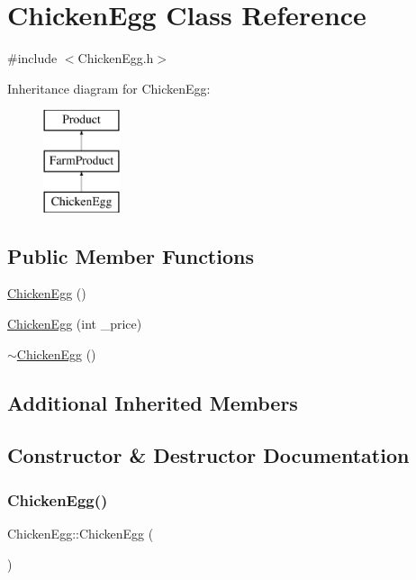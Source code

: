 \hypertarget{classChickenEgg}{}\section{Chicken\+Egg Class Reference}
\label{classChickenEgg}


{\ttfamily \#include $<$Chicken\+Egg.\+h$>$}

Inheritance diagram for Chicken\+Egg\+:\begin{figure}[H]
\begin{center}
\leavevmode
\includegraphics[height=3.000000cm]{classChickenEgg}
\end{center}
\end{figure}
\subsection*{Public Member Functions}
\begin{DoxyCompactItemize}
\item 
\mbox{\hyperlink{classChickenEgg_aebcaf30d3a47ddb3a7874ed4e4c7f529}{Chicken\+Egg}} ()
\item 
\mbox{\hyperlink{classChickenEgg_a60870874efefdf7d6d4604ccbe6a1885}{Chicken\+Egg}} (int \+\_\+price)
\item 
\mbox{\hyperlink{classChickenEgg_aa71db8cfe4808e5dbf84643cfe0d4778}{$\sim$\+Chicken\+Egg}} ()
\end{DoxyCompactItemize}
\subsection*{Additional Inherited Members}


\subsection{Constructor \& Destructor Documentation}
\mbox{\label{classChickenEgg_aebcaf30d3a47ddb3a7874ed4e4c7f529}} 
\subsubsection{\texorpdfstring{ChickenEgg()}{ChickenEgg()}\hspace{0.1cm}{\footnotesize\ttfamily [1/2]}}
{\footnotesize\ttfamily Chicken\+Egg\+::\+Chicken\+Egg (\begin{DoxyParamCaption}{ }\end{DoxyParamCaption})}

